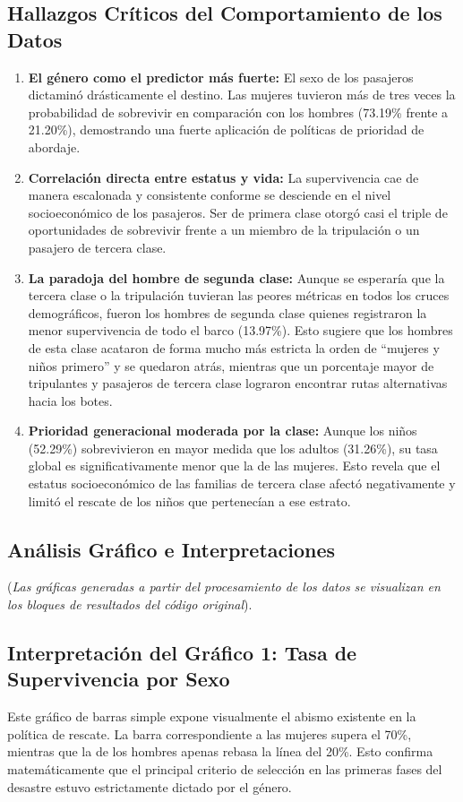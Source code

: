\documentclass[letterpaper,11pt]{article}
\begin{document}
\subsection{Hallazgos Críticos del Comportamiento de los Datos}
\begin{enumerate}
    \item \textbf{El género como el predictor más fuerte:} El sexo de los pasajeros dictaminó drásticamente el destino. Las mujeres tuvieron más de tres veces la probabilidad de sobrevivir en comparación con los hombres (73.19\% frente a 21.20\%), demostrando una fuerte aplicación de políticas de prioridad de abordaje.
    \item \textbf{Correlación directa entre estatus y vida:} La supervivencia cae de manera escalonada y consistente conforme se desciende en el nivel socioeconómico de los pasajeros. Ser de primera clase otorgó casi el triple de oportunidades de sobrevivir frente a un miembro de la tripulación o un pasajero de tercera clase.
    \item \textbf{La paradoja del hombre de segunda clase:} Aunque se esperaría que la tercera clase o la tripulación tuvieran las peores métricas en todos los cruces demográficos, fueron los hombres de segunda clase quienes registraron la menor supervivencia de todo el barco (13.97\%). Esto sugiere que los hombres de esta clase acataron de forma mucho más estricta la orden de ``mujeres y niños primero'' y se quedaron atrás, mientras que un porcentaje mayor de tripulantes y pasajeros de tercera clase lograron encontrar rutas alternativas hacia los botes.
    \item \textbf{Prioridad generacional moderada por la clase:} Aunque los niños (52.29\%) sobrevivieron en mayor medida que los adultos (31.26\%), su tasa global es significativamente menor que la de las mujeres. Esto revela que el estatus socioeconómico de las familias de tercera clase afectó negativamente y limitó el rescate de los niños que pertenecían a ese estrato.
\end{enumerate}

\subsection{Análisis Gráfico e Interpretaciones}
(\textit{Las gráficas generadas a partir del procesamiento de los datos se visualizan en los bloques de resultados del código original}).

\subsection*{Interpretación del Gráfico 1: Tasa de Supervivencia por Sexo}
Este gráfico de barras simple expone visualmente el abismo existente en la política de rescate. La barra correspondiente a las mujeres supera el 70\%, mientras que la de los hombres apenas rebasa la línea del 20\%. Esto confirma matemáticamente que el principal criterio de selección en las primeras fases del desastre estuvo estrictamente dictado por el género.
\end{document}
